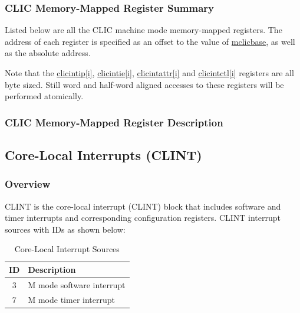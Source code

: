 \documentclass[main\_\_EN.tex]{subfiles}
\begin{document}

\hypertarget{riscvcpu-clic-memmap-reg-summ}{}
\subsubsection{CLIC Memory-Mapped Register Summary}
\label{sec:riscvcpu-clic-memmap-reg-summ}

Listed below are all the CLIC machine mode memory-mapped registers. The address of each register is specified as an offset to the value of  \hyperref[fielddesc:MCLICBASE]{mclicbase}, as well as the absolute address.

Note that the \hyperref[regdesc:MCLICINTIP_REG_i]{clicintip[i]}, \hyperref[regdesc:MCLICINTIE_REG_i]{clicintie[i]}, \hyperref[regdesc:MCLICINTATTR_REG_i]{clicintattr[i]} and \hyperref[regdesc:MCLICINTCTL_REG_i]{clicintctl[i]} registers are all byte sized. Still word and half-word aligned accesses to these registers will be performed atomically.





\hypertarget{riscvcpu-clic-memmap-reg}{}
\subsubsection{CLIC Memory-Mapped Register Description}
\label{sec:riscvcpu-clic-memmap-reg}



\newpage
\subsection{Core-Local Interrupts (CLINT)}
\label{sec:riscvcpu-clint}
\subsubsection{Overview}
\label{sec:riscvcpu-clint-overview}
CLINT is the core-local interrupt (CLINT) block that includes software and timer interrupts and corresponding configuration registers. CLINT interrupt sources with IDs as shown below:

\begin{longtable}{ | c | l | }
\caption{Core-Local Interrupt Sources} \label{tab:riscvcpu-clint-table}
\\ \hline
\rowcolor{lightgray}
ID & Description \\ \hline
3 & M mode software interrupt \\ \hline
7 & M mode timer interrupt \\ \hline
\end{longtable}
\end{document}
